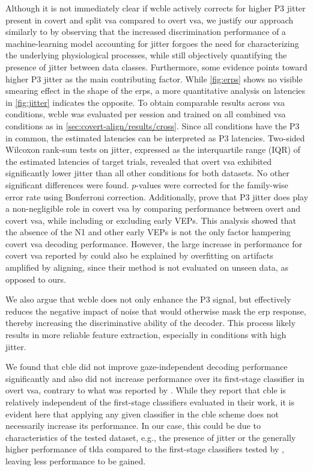 Although it is not immediately clear if \ac{wcble} actively corrects for higher P3 jitter
present in covert and split \ac{vsa} compared to overt \ac{vsa},
we justify our approach similarly to \cite{Hardiansyah2020} by
observing that the increased discrimination performance of a machine-learning
model accounting for jitter forgoes the need for characterizing the underlying
physiological processes, while still objectively quantifying the presence of
jitter between data classes.
Furthermore, some evidence points toward higher P3 jitter as the main
contributing factor.
While \autoref{fig:erps} shows no visible smearing effect in
the shape of the \acp{erp}, a more quantitative analysis on latencies in
\autoref{fig:jitter} indicates the opposite.
To obtain comparable results across \ac{vsa} conditions, \ac{wcble} was
evaluated per session and trained on all combined \ac{vsa} conditions as in
\cref{sec:covert-align/results/cross}.
Since all conditions have the P3 in common, the estimated latencies can be
interpreted as P3 latencies.
Two-sided Wilcoxon rank-sum tests on jitter, expressed as the interquartile
range (IQR) of the estimated latencies of target trials, revealed that overt
\ac{vsa} exhibited significantly lower jitter than all other conditions for
both datasets.
No other significant differences were found.
$p$-values were corrected for the family-wise error rate using Bonferroni
correction.
Additionally, \textcite{Arico2014} prove that P3 jitter does play a
non-negligible role in covert \ac{vsa} by comparing performance between
overt and covert \ac{vsa}, while including or excluding early VEPs.
This analysis showed that the absence of the N1 and other early VEPs is not the
only factor hampering covert \ac{vsa} decoding performance.
However, the large increase in performance for covert \ac{vsa} reported by
\cite{Arico2014} could also
be explained by overfitting on artifacts amplified by aligning, since their
method is not evaluated on unseen data, as opposed to ours.

We also argue that \ac{wcble} does not only enhance the P3 signal, but effectively reduces the
negative impact of noise that would otherwise mask the \ac{erp} response, thereby increasing the
discriminative ability of the decoder.
This process likely results in more reliable feature extraction, especially in conditions
with high jitter.

We found that \ac{cble} did not improve gaze-independent decoding performance
significantly and also did not increase performance over its first-stage
classifier in overt \ac{vsa}, contrary to what was reported by \cite{Mowla2017}.
While they report that \ac{cble} is relatively independent of the
first-stage classifiers evaluated in their work, it is evident here that
applying any given classifier in the \ac{cble} scheme does not necessarily increase
its performance.
In our case, this could be due to characteristics of the tested dataset, e.g.,
the presence of jitter or the generally higher performance of \ac{tlda} compared to the
first-stage classifiers tested by \cite{Mowla2017}, leaving less
performance to be gained.

